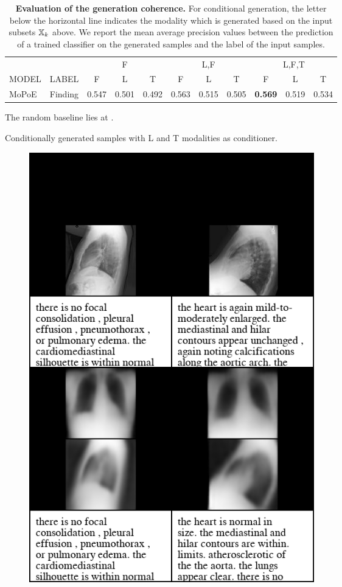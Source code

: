     \begin{frame}
        \begin{table}[]
            \centering
            \begin{tabular}{lcccccccccc}

                & & \multicolumn{3}{c}{F} & \multicolumn{3}{c}{L,F} & \multicolumn{3}{c}{L,F,T} \\  \cmidrule(l){3-5} \cmidrule(l){6-8} \cmidrule(l){9-11} MODEL & LABEL & F & L & T & F & L & T & F & L & T \\\midrule
                MoPoE & Finding & 0.547 & 0.501 & 0.492 & 0.563 & 0.515 & 0.505 & \textbf{0.569} & 0.519 & 0.534
            \end{tabular}
            \caption{\small{\textbf{Evaluation of the generation coherence.} For conditional generation, the letter below the horizontal line indicates the modality which is generated based on the input subsets $\mathbb{X} _k$ above. We report the mean average precision values between the prediction of a trained classifier on the generated samples and the label of the input samples.}}
        \end{table}
        \pause
        The random baseline lies at .

    \end{frame}

    \begin{frame}{Conditionally generated samples with L and T modalities as conditioner.}

        \begin{figure}
            \centering
            \includegraphics[width=0.6\textwidth, height = 0.85\textheight, keepaspectratio]{slides/cond_gen/Lateral_text_blacked.png}

        \end{figure}
    \end{frame}

